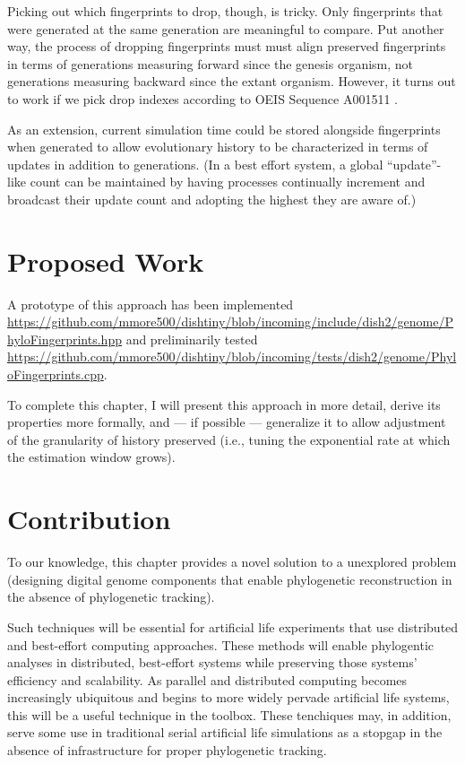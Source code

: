 Picking out which fingerprints to drop, though, is tricky.
Only fingerprints that were generated at the same generation are meaningful to compare.
Put another way, the process of dropping fingerprints must must align preserved fingerprints in terms of generations measuring forward since the genesis organism, not generations measuring backward since the extant organism.
However, it turns out to work if we pick drop indexes according to OEIS Sequence A001511 \cite{sloane2021a001511}.

As an extension, current simulation time could be stored alongside fingerprints when generated to allow evolutionary history to be characterized in terms of updates in addition to generations.
(In a best effort system, a global ``update''-like count can be maintained by having processes continually increment and broadcast their update count and adopting the highest they are aware of.)

\section{Proposed Work}

A prototype of this approach has been implemented \url{https://github.com/mmore500/dishtiny/blob/incoming/include/dish2/genome/PhyloFingerprints.hpp} and preliminarily tested \url{https://github.com/mmore500/dishtiny/blob/incoming/tests/dish2/genome/PhyloFingerprints.cpp}.

To complete this chapter, I will present this approach in more detail, derive its properties more formally, and --- if possible --- generalize it to allow adjustment of the granularity of history preserved (i.e., tuning the exponential rate at which the estimation window grows).

\section{Contribution}

To our knowledge, this chapter provides a novel solution to a unexplored problem (designing digital genome components that enable phylogenetic reconstruction in the absence of phylogenetic tracking).

Such techniques will be essential for artificial life experiments that use distributed and best-effort computing approaches.
These methods will enable phylogentic analyses in distributed, best-effort systems while preserving those systems' efficiency and scalability.
As parallel and distributed computing becomes increasingly ubiquitous and begins to more widely pervade artificial life systems, this will be a useful technique in the toolbox.
These tenchiques may, in addition, serve some use in traditional serial artificial life simulations as a stopgap in the absence of infrastructure for proper phylogenetic tracking.

